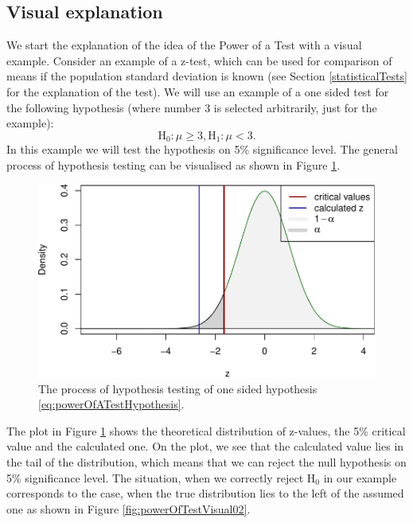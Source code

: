 \documentclass[
]{book}
\theoremstyle{definition}
\theoremstyle{definition}
\theoremstyle{definition}
\theoremstyle{definition}
\theoremstyle{remark}
\begin{document}
\hypertarget{visual-explanation}{%
\subsection{Visual explanation}\label{visual-explanation}}

We start the explanation of the idea of the Power of a Test with a visual example. Consider an example of a z-test, which can be used for comparison of means if the population standard deviation is known (see Section \ref{statisticalTests} for the explanation of the test). We will use an example of a one sided test for the following hypothesis (where number 3 is selected arbitrarily, just for the example):
\begin{equation}
    \mathrm{H}_0: \mu \geq 3, \mathrm{H}_1: \mu < 3.
    \label{eq:powerOfATestHypothesis}
\end{equation}
In this example we will test the hypothesis on 5\% significance level. The general process of hypothesis testing can be visualised as shown in Figure \ref{fig:powerOfTestVisual01}.

\begin{figure}
\centering
\includegraphics{Svetunkov---Statistics-for-Business-Analytics_files/figure-latex/powerOfTestVisual01-1.pdf}
\caption{\label{fig:powerOfTestVisual01}The process of hypothesis testing of one sided hypothesis \eqref{eq:powerOfATestHypothesis}.}
\end{figure}

The plot in Figure \ref{fig:powerOfTestVisual01} shows the theoretical distribution of z-values, the 5\% critical value and the calculated one. On the plot, we see that the calculated value lies in the tail of the distribution, which means that we can reject the null hypothesis on 5\% significance level. The situation, when we correctly reject H\(_0\) in our example corresponds to the case, when the true distribution lies to the left of the assumed one as shown in Figure \ref{fig:powerOfTestVisual02}.
\end{document}
